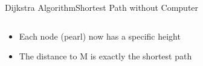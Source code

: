 \begin{frame}{Dijkstra Algorithm}{Shortest Path without Computer}
\begin{columns}
\begin{column}{0.5\linewidth}
%
        \vspace{-0.5em}

      \begin{itemize}
        \item
          Each node (pearl) now has a specific height
        \item
          The distance to M is exactly the {\color{MainA}shortest path}
        \end{itemize}
    \end{column}
  \end{columns}
\end{frame}


